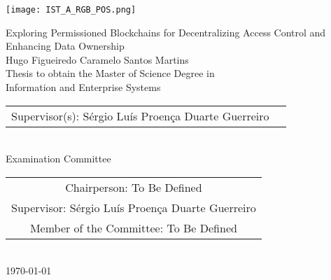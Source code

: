 \texttt{[image: IST\_A\_RGB\_POS.png]}

\begin{center}
    \vspace{2.5cm}

    \vspace{1.5cm}
    {\FontLb Exploring Permissioned Blockchains for Decentralizing Access Control and Enhancing Data Ownership} \\
    \vspace{1.5cm}  
    {\FontMb Hugo Figueiredo Caramelo Santos Martins} \\
    \vspace{1.5cm}
    {\FontSn Thesis to obtain the Master of Science Degree in} \\
    \vspace{0.3cm}
    {\FontLb Information and Enterprise Systems} \\
    \vspace{1.5cm}
    {\FontSn %
        \begin{tabular}{ll}
            Supervisor(s): Sérgio Luís Proença Duarte Guerreiro
        \end{tabular} } \\
    \vspace{1.5cm}
    {\FontMb Examination Committee} \\
    \vspace{0.3cm}
    {\FontSn %
        \begin{tabular}{c}
            Chairperson:     To Be Defined \\ 
            Supervisor: Sérgio Luís Proença Duarte Guerreiro \\ 
            Member of the Committee: To Be Defined  
        \end{tabular} } \\
    \vspace*{\fill}
    {\FontMb \today}
\end{center}